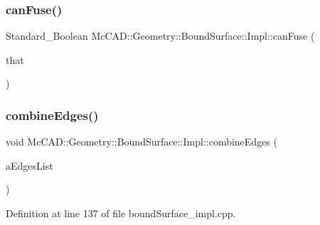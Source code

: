 \subsubsection{\texorpdfstring{can\+Fuse()}{canFuse()}\hspace{0.1cm}{\footnotesize\ttfamily [2/2]}}
{\footnotesize\ttfamily Standard\+\_\+\+Boolean Mc\+C\+A\+D\+::\+Geometry\+::\+Bound\+Surface\+::\+Impl\+::can\+Fuse (\begin{DoxyParamCaption}\item[{const \hyperlink{classMcCAD_1_1Geometry_1_1BoundSurface}{Bound\+Surface} \&}]{that }\end{DoxyParamCaption})}

\mbox{\label{classMcCAD_1_1Geometry_1_1BoundSurface_1_1Impl_ac4d7badfc8a2ea9448e49f325a1b4636}} 
\subsubsection{\texorpdfstring{combine\+Edges()}{combineEdges()}\hspace{0.1cm}{\footnotesize\ttfamily [1/2]}}
{\footnotesize\ttfamily void Mc\+C\+A\+D\+::\+Geometry\+::\+Bound\+Surface\+::\+Impl\+::combine\+Edges (\begin{DoxyParamCaption}\item[{std\+::vector$<$ std\+::shared\+\_\+ptr$<$ \hyperlink{classMcCAD_1_1Geometry_1_1Edge}{Edge} $>$$>$ \&}]{a\+Edges\+List }\end{DoxyParamCaption})}



Definition at line 137 of file bound\+Surface\+\_\+impl.\+cpp.


